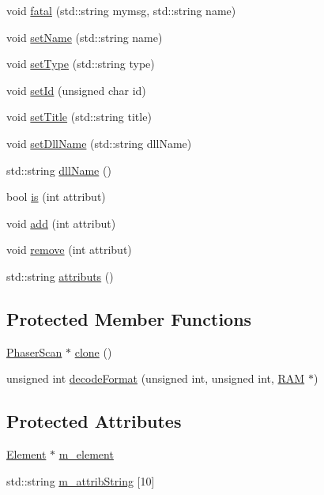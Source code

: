 \begin{DoxyCompactItemize}
void \hyperlink{classObject_ae62acd3d09f716220f75f252dc38bc9a}{fatal} (std::string mymsg, std::string name)
\item 
void \hyperlink{classObject_ae30fea75683c2d149b6b6d17c09ecd0c}{setName} (std::string name)
\item 
void \hyperlink{classObject_aae534cc9d982bcb9b99fd505f2e103a5}{setType} (std::string type)
\item 
void \hyperlink{classObject_a398fe08cba594a0ce6891d59fe4f159f}{setId} (unsigned char id)
\item 
void \hyperlink{classObject_a89557dbbad5bcaa02652f5d7fa35d20f}{setTitle} (std::string title)
\item 
void \hyperlink{classObject_a870c5af919958c2136623b2d7816d123}{setDllName} (std::string dllName)
\item 
std::string \hyperlink{classObject_a2e3947f2870094c332d7454117f3ec63}{dllName} ()
\item 
bool \hyperlink{classAttrib_a704f26af560909ad22065083bb7d4c34}{is} (int attribut)
\item 
void \hyperlink{classAttrib_a235f773af19c900264a190b00a3b4ad7}{add} (int attribut)
\item 
void \hyperlink{classAttrib_a7d4ef7e32d93cb287792b87b857e79f3}{remove} (int attribut)
\item 
std::string \hyperlink{classAttrib_aee7bbf16b144887f196e1341b24f8a26}{attributs} ()
\end{DoxyCompactItemize}
\subsection*{Protected Member Functions}
\begin{DoxyCompactItemize}
\item 
\hyperlink{classPhaserScan}{PhaserScan} $\ast$ \hyperlink{classPhaserScan_a4c842f4bda17fb8907c51efc0ccb9d43}{clone} ()
\item 
unsigned int \hyperlink{classPhaserScan_ad01a0ce0223859a138e3a78023a924bb}{decodeFormat} (unsigned int, unsigned int, \hyperlink{classRAM}{RAM} $\ast$)
\end{DoxyCompactItemize}
\subsection*{Protected Attributes}
\begin{DoxyCompactItemize}
\item 
\hyperlink{classElement}{Element} $\ast$ \hyperlink{classProcessus_aa9d24d53c3e52f36786cabb5d8e296e7}{m\_\-element}
\item 
std::string \hyperlink{classAttrib_a3414521d7a82476e874b25a5407b5e63}{m\_\-attribString} \mbox{[}10\mbox{]}
\end{DoxyCompactItemize}
